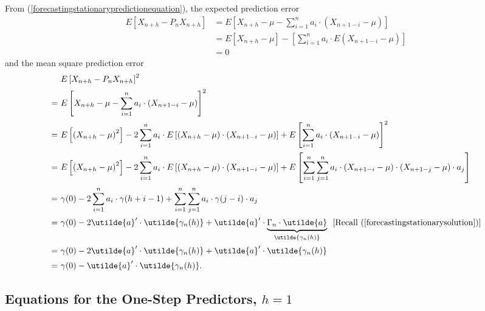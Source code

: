 \documentclass[11pt, a4paper]{article}
\numberwithin{equation}{section}
\theoremstyle{definition}
\begin{document}
From (\ref{forecastingstationarypredictionequation}), the expected prediction error
\begin{align*}
E\left[ X_{n+h} - P_n X_{n+h} \right] &= E\left[ X_{n+h} - \mu - \sum \limits_{i = 1}^{n} a_i \cdot \left( X_{n+1-i} - \mu \right) \right] \\[0.1em]
&= E\left[ X_{n+h} - \mu \right] - \left[ \sum \limits_{i = 1}^{n} a_i \cdot E\left( X_{n+1-i} - \mu \right) \right] \\[0.1em]
&= 0
\end{align*}
and the mean square prediction error
\begin{align*}
&E\left[ X_{n+h} - P_n X_{n+h} \right]^2 \\[0.1em]
=\,\, &E\left[ X_{n+h} - \mu - \sum \limits_{i = 1}^{n} a_i \cdot \left( X_{n+1-i} - \mu \right) \right]^2 \\[0.1em]
=\,\, &E\left[ \left( X_{n+h} - \mu \right)^2 \right] - 2 \sum \limits_{i = 1}^{n} a_i \cdot E\left[ \left( X_{n+h} - \mu \right) \cdot \left( X_{n+1-i} - \mu \right)\right] + E\left[\sum \limits_{i = 1}^{n} a_i \cdot \left( X_{n+1-i} - \mu \right) \right]^2 \\[0.1em]
=\,\, &E\left[ \left( X_{n+h} - \mu \right)^2 \right] - 2 \sum \limits_{i = 1}^{n} a_i \cdot E\left[ \left( X_{n+h} - \mu \right) \cdot \left( X_{n+1-i} - \mu \right)\right] + E\left[\sum \limits_{i = 1}^{n} \sum \limits_{j = 1}^{n} a_i \cdot \left( X_{n+1-i} - \mu \right) \cdot \left( X_{n+1-j} - \mu \right) \cdot a_j \right] \\[0.1em]
=\,\, &\gamma(0) - 2 \sum \limits_{i = 1}^{n} a_i \cdot \gamma(h+i-1) + \sum \limits_{i = 1}^{n} \sum \limits_{j = 1}^{n} a_i \cdot \gamma(j-i) \cdot a_j \\[0.1em]
=\,\, &\gamma(0) - 2 \utilde{a}' \cdot \utilde{\gamma_n(h)} + \utilde{a}' \cdot \underbrace{\Gamma_n \cdot \utilde{a}}_{\utilde{\gamma_n(h)}} \,\,\,\, [\text{Recall } (\ref{forecastingstationarysolution})] \\[0.1em]
=\,\, &\gamma(0) - 2 \utilde{a}' \cdot \utilde{\gamma_n(h)} + \utilde{a}' \cdot \utilde{\gamma_n(h)} \\[0.1em]
=\,\, &\gamma(0) - \utilde{a}' \cdot \utilde{\gamma_n(h)}.
\end{align*}

\subsection{Equations for the One-Step Predictors, $h = 1$}
\end{document}
